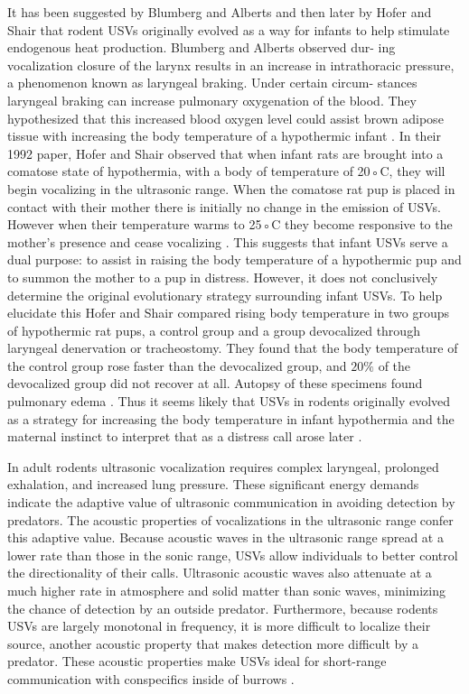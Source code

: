 \documentclass[12pt, letter]{report}
\begin{document}
It has been suggested by Blumberg and Alberts and then later by Hofer and Shair that rodent USVs originally evolved as a way for infants to help stimulate endogenous heat production. Blumberg and Alberts observed dur- ing vocalization closure of the larynx results in an increase in intrathoracic pressure, a phenomenon known as laryngeal braking. Under certain circum- stances laryngeal braking can increase pulmonary oxygenation of the blood. They hypothesized that this increased blood oxygen level could assist brown adipose tissue with increasing the body temperature of a hypothermic infant \cite{Blumberg1990}. In their 1992 paper, Hofer and Shair observed that when infant rats are brought into a comatose state of hypothermia, with a body of temperature of 20◦C, they will begin vocalizing in the ultrasonic range. When the comatose rat pup is placed in contact with their mother there is initially no change in the emission of USVs. However when their temperature warms to 25◦C they become responsive to the mother’s presence and cease vocalizing \cite{Hofer1992}. This suggests that infant USVs serve a dual purpose: to assist in raising the body temperature of a hypothermic pup and to summon the mother to a pup in distress. However, it does not conclusively determine the original evolutionary strategy surrounding infant USVs. To help elucidate this Hofer and Shair compared rising body temperature in two groups of hypothermic rat pups, a control group and a group devocalized through laryngeal denervation or tracheostomy. They found that the body temperature of the control group rose faster than the devocalized group, and $20 \%$ of the devocalized group did not recover at all. Autopsy of these specimens found pulmonary edema \cite{Hofer1993}. Thus it seems likely that USVs in rodents originally evolved as a strategy for increasing the body temperature in infant hypothermia and the maternal instinct to interpret that as a distress call arose later \cite{Hofer2010}.

In adult rodents ultrasonic vocalization requires complex laryngeal, prolonged exhalation, and increased lung pressure. These significant energy demands indicate the adaptive value of ultrasonic communication in avoiding detection by predators. The acoustic properties of vocalizations in the ultrasonic range confer this adaptive value. Because acoustic waves in the ultrasonic range spread at a lower rate than those in the sonic range, USVs allow individuals to better control the directionality of their calls. Ultrasonic acoustic waves also attenuate at a much higher rate in atmosphere and solid matter than sonic waves, minimizing the chance of detection by an outside predator. Furthermore, because rodents USVs are largely monotonal in frequency, it is more difficult to localize their source, another acoustic property that makes detection more difficult by a predator. These acoustic properties make USVs ideal for short-range communication with conspecifics inside of burrows \cite{Brudzynski2007a}.
\end{document}
